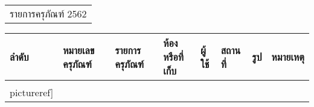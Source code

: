 \documentclass{article}
\newcommand{\placeholder}[1]{\textbf{$<$ #1 $>$}}
\newcommand{\pictureref}{\placeholder{pic_name}}
\begin{document}



	\begin{tabular}{c}
		\T รายการครุภัณฑ์ 2562
	\end{tabular}

	\vspace{15mm}
	\begin{tabularx}{\linewidth}{|m{1cm}|m{5cm}|m{3.5cm}|m{3cm}|m{2.5cm}|m{2.5cm}|m{2.5cm}|m{2.5cm}|}

    \hline
	\T ลำดับ  &\T หมายเลขครุภัณฑ์  &\T รายการครุภัณฑ์  &\T ห้องหรือที่เก็บ &\T ผู้ใช้ &\T สถานที่ & \T รูป & \T หมายเหตุ \\
	\endhead
    \hline

  

\begin{minipage}[t]{\textwidth}
\texttt{[image: \\pictureref]} 
\end{minipage}
&



\\
\hline
   

	\hline

	\end{tabularx}

	
\end{document}
